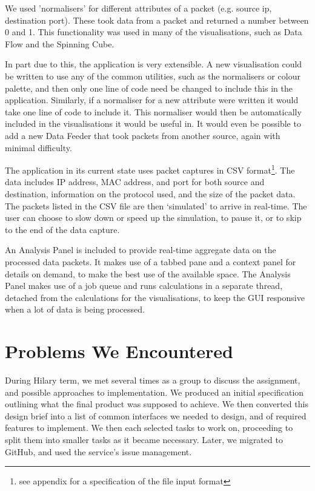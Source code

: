 \documentclass[12pt,a4paper]{article}
\begin{document}
			We used 'normalisers' for different attributes of a packet (e.g. source ip, destination port).  These took data from a packet and returned a number between 0 and 1.  This functionality was used in many of the visualisations, such as Data Flow and the Spinning Cube.

			In part due to this, the application is very extensible.  A new visualisation could be written to use any of the common utilities, such as the normalisers or colour palette, and then only one line of code need be changed to include this in the application.  Similarly, if a normaliser for a new attribute were written it would take one line of code to include it.   This normaliser would then be automatically included in the visualisations it would be useful in.  It would even be possible to add a new Data Feeder that took packets from another source, again with minimal difficulty.
			
			The application in its current state uses packet captures in CSV format\footnote{see appendix for a specification of the file input format}. The data includes IP address, MAC address, and port for both source and destination,  information on the protocol used, and the size of the packet data. The packets listed in the CSV file are then `simulated' to arrive in real-time. The user can choose to slow down or speed up the simulation, to pause it, or to skip to the end of the data capture.
			
			An Analysis Panel is included to provide real-time aggregate data on the processed data packets. It makes use of a tabbed pane and a context panel for details on demand, to make the best use of the available space. The Analysis Panel makes use of a job queue and runs calculations in a separate thread, detached from the calculations for the visualisations, to keep the GUI responsive when a lot of data is being processed.

	\section*{Problems We Encountered}
        During Hilary term, we met several times as a group to discuss the assignment, and possible approaches to implementation. We produced an initial specification outlining what the final product was supposed to achieve. We then converted this design brief into a list of common interfaces we needed to design, and of required features to implement. We then each selected tasks to work on, proceeding to split them into smaller tasks as it became necessary. Later, we migrated to GitHub, and used the service's issue management.
		
\end{document}
